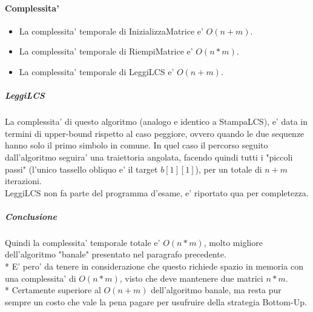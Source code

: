 \pagebreak

\paragraph{Complessita'}

\begin{itemize}
    \item La complessita' temporale di InizializzaMatrice e' $O(n+m)$.
    \item La complessita' temporale di RiempiMatrice e' $O(n*m)$.
    \item La complessita' temporale di LeggiLCS e' $O(n+m)$.
\end{itemize}

\subparagraph{LeggiLCS}
La complessita' di questo algoritmo (analogo e identico a StampaLCS), e' data in termini di upper-bound rispetto al caso peggiore, ovvero quando le due sequenze hanno solo il primo simbolo in comune. In quel caso il percorso seguito dall'algoritmo seguira' una traiettoria angolata, facendo quindi tutti i "piccoli passi" (l'unico tassello obliquo e' il target $b[1][1]$), per un totale di $n+m$ iterazioni. \\
LeggiLCS non fa parte del programma d'esame, e' riportato qua per completezza.

\subparagraph{Conclusione}
Quindi la complessita' temporale totale e' $O(n*m)$, molto migliore dell'algoritmo "banale" presentato nel paragrafo precedente. \\ *
E' pero' da tenere in considerazione che questo richiede spazio in memoria con una complessita' di $O(n * m)$, visto che deve mantenere due matrici $n*m$. \\*
Certamente superiore al $O(n + m)$ dell'algoritmo banale, ma resta pur sempre un costo che vale la pena pagare per usufruire della strategia Bottom-Up.
